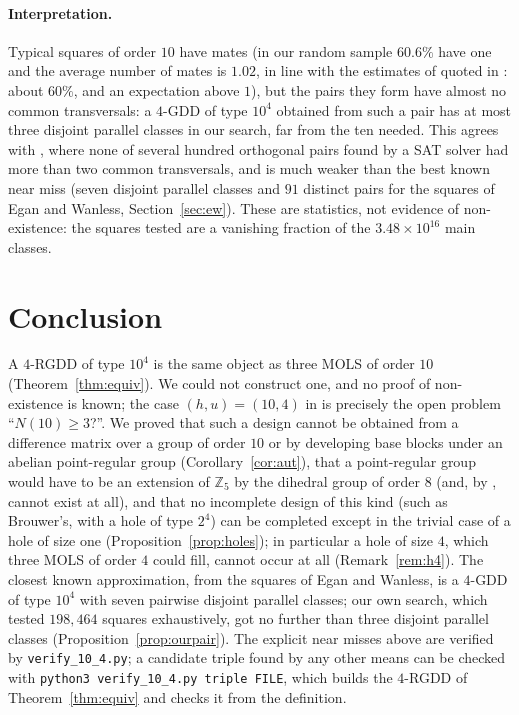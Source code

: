 \documentclass[11pt]{article}
\theoremstyle{remark}
\newcommand{\Z}{\mathbb{Z}}
\begin{document}
\paragraph{Interpretation.}  Typical squares of order $10$ have mates (in our random sample $60.6\%$ have one and the average number of mates is $1.02$, in line with the estimates of \cite{MMM07} quoted in \cite[Section~5]{EW16}: about $60\%$, and an expectation above $1$), but the pairs they
form have almost no common transversals: a $4$-GDD of type $10^{4}$ obtained from such a
pair has at most three disjoint parallel classes in our search, far from the ten needed.  This agrees with
\cite[Table~3]{BKS26}, where none of several hundred orthogonal pairs found by a SAT
solver had more than two common transversals, and is much weaker than the best known
near miss (seven disjoint parallel classes and $91$ distinct pairs for the squares of Egan and
Wanless, Section~\ref{sec:ew}).  These are statistics, not evidence of non-existence: the squares
tested are a vanishing fraction of the $3.48\times 10^{16}$ main classes.

\section{Conclusion}

A $4$-RGDD of type $10^{4}$ is the same object as three MOLS of order $10$
(Theorem~\ref{thm:equiv}).  We could not construct one, and no proof of non-existence is
known; the case $(h,u)=(10,4)$ in \cite{WG14,WG17} is precisely the open problem
``$N(10)\ge 3$?''.  We proved that such a design cannot be obtained from a difference matrix
over a group of order $10$ or by developing base blocks under an abelian point-regular
group (Corollary~\ref{cor:aut}), that a point-regular group would have to be an extension
of $\Z_5$ by the dihedral group of order $8$ (and, by \cite{MMM07}, cannot exist at all),
and that no incomplete design of this kind (such as Brouwer's, with a hole of type $2^{4}$)
can be completed except in the trivial case of a hole of size one
(Proposition~\ref{prop:holes}); in particular a hole of size $4$, which three MOLS of order
$4$ could fill, cannot occur at all (Remark~\ref{rem:h4}).  The closest known approximation, from the squares of Egan and Wanless, is a $4$-GDD of type
$10^{4}$ with seven pairwise disjoint parallel classes; our own search, which tested
$198{,}464$ squares exhaustively, got no further than three disjoint parallel classes (Proposition~\ref{prop:ourpair}).  The
explicit near misses above are verified by \texttt{verify\_10\_4.py}; a candidate triple
found by any other means can be checked with \texttt{python3 verify\_10\_4.py triple FILE},
which builds the $4$-RGDD of Theorem~\ref{thm:equiv} and checks it from the definition.
\end{document}
